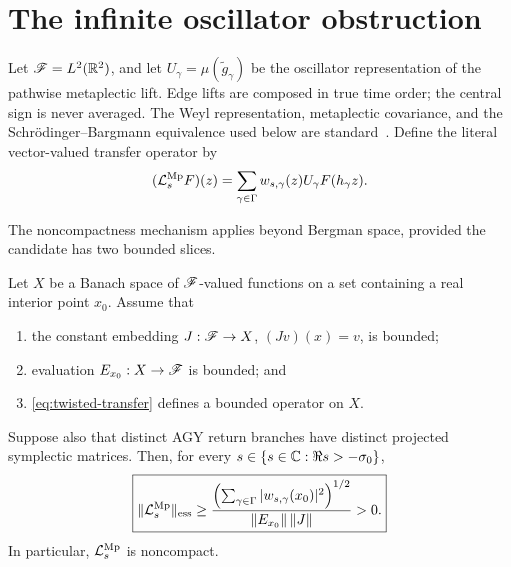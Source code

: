 \section{The infinite oscillator obstruction}
\label{sec:oscillator}

Let \(\mathscr{F}=L^2(\mathbb{R}^2)\), and let
\(U_\gamma=\mu(\widetilde g_\gamma)\) be the oscillator representation of
the pathwise metaplectic lift.  Edge lifts are composed in true time order;
the central sign is never averaged.  The Weyl representation, metaplectic
covariance, and the Schr\"odinger--Bargmann equivalence used below are
standard~\citep{folland1989}.  Define the literal vector-valued transfer
operator by
\begin{equation}
 (\mathcal{L}_s^{\rm Mp}F)(z)
 =\sum_{\gamma\in\Gamma}
 w_{s,\gamma}(z)U_\gamma F(h_\gamma z).
 \label{eq:twisted-transfer}
\end{equation}

The noncompactness mechanism applies beyond Bergman space, provided the
candidate has two bounded slices.

\begin{theorem}
\label{thm:evaluation-slice}
Let \(X\) be a Banach space of \(\mathscr{F}\)-valued functions on a set containing
a real interior point \(x_0\).  Assume that
\begin{enumerate}
 \item the constant embedding
 \(J:\mathscr{F}\to X\), \((Jv)(x)=v\), is bounded;
 \item evaluation \(E_{x_0}:X\to\mathscr{F}\) is bounded; and
 \item \eqref{eq:twisted-transfer} defines a bounded operator on \(X\).
\end{enumerate}
Suppose also that distinct AGY return branches have distinct projected
symplectic matrices.  Then, for every \(s\in\{s\in\mathbb{C}:\Re s>-\sigma_0\}\),
\begin{equation}
 \boxed{
 \|\mathcal{L}_s^{\rm Mp}\|_{\mathrm{ess}}
 \geq
 \frac{\left(\sum_{\gamma\in\Gamma}
 |w_{s,\gamma}(x_0)|^2\right)^{1/2}}
 {\|E_{x_0}\|\,\|J\|}>0.}
 \label{eq:evaluation-bound}
\end{equation}
In particular, \(\mathcal{L}_s^{\rm Mp}\) is noncompact.
\end{theorem}

